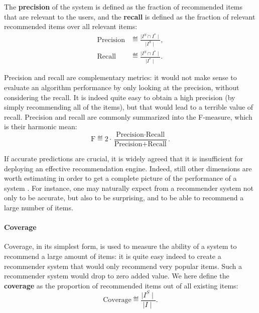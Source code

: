\noindent
The \textbf{precision} of the
system is
defined as the fraction of recommended items that are relevant to the users,
and the \textbf{recall} is defined as the fraction of relevant recommended
items over all relevant items:
\begin{align*}
  \text{Precision} &\eqdef \frac{\mid I^S \cap I^*\mid}{\mid I^S \mid},\\
  \text{Recall} &\eqdef \frac{\mid I^S \cap I^*\mid}{\mid I^* \mid}.
\end{align*}

Precision and recall are complementary metrics: it would not make sense to
evaluate an algorithm performance by only looking at the precision, without
considering the recall. It is indeed quite easy to obtain a high precision (by
simply recommending all of the items), but that would lead to a terrible
value of recall. Precision and recall are commonly summarized into the
F-measure, which is their harmonic mean:
  $$
  \text{F} \eqdef 2 \cdot \frac{\text{Precision} \cdot
  \text{Recall}}{\text{Precision} + \text{Recall}}.
  $$

If accurate predictions are crucial, it is widely agreed that it is
insufficient for deploying an effective recommendation engine. Indeed, still
other dimensions are worth estimating in order to get a complete picture of the
performance of a system
\cite{NeeRieKonACM2006,HerKonJohTerRieACM2004,KamBriRecSys2014}.  For instance,
one may naturally expect from a recommender system not only to be accurate, but
also to be surprising, and to be able to recommend a large number of items.

\paragraph{Coverage\\}
Coverage, in its simplest form, is used to measure the ability of a system to
recommend a large amount of items: it is quite easy indeed to create a
recommender system that would only recommend very popular items. Such a
recommender system would drop to zero added value. We here define the
\textbf{coverage} as the proportion of recommended items out of all existing
items:
$$\text{Coverage} \eqdef \frac{\mid I^S\mid}{\mid I\mid}.$$

